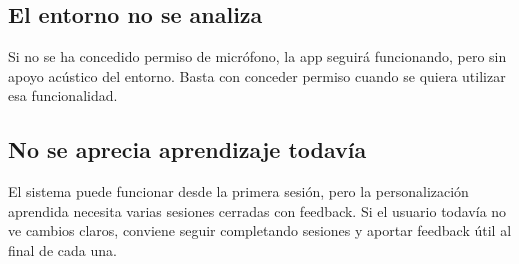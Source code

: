\subsection*{El entorno no se analiza}

Si no se ha concedido permiso de micrófono, la app seguirá funcionando, pero
sin apoyo acústico del entorno. Basta con conceder permiso cuando se quiera
utilizar esa funcionalidad.

\subsection*{No se aprecia aprendizaje todavía}

El sistema puede funcionar desde la primera sesión, pero la personalización
aprendida necesita varias sesiones cerradas con feedback. Si el usuario todavía
no ve cambios claros, conviene seguir completando sesiones y aportar feedback
útil al final de cada una.
